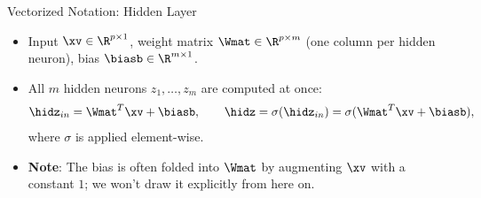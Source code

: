 %
%

\begin{vbframe}{Vectorized Notation: Hidden Layer}
\begin{itemize}
\item Input $\xv \in \R^{p \times 1}$, weight matrix $\Wmat \in \R^{p \times m}$ (one column per hidden neuron), bias $\biasb \in \R^{m \times 1}$.
\vspace{3mm}
\item All $m$ hidden neurons $z_1, \dots, z_m$ are computed at once:
$$ \hidz_{in} = \Wmat^T \xv + \biasb, \qquad \hidz = \sigma(\hidz_{in}) = \sigma(\Wmat^T \xv + \biasb),$$
where $\sigma$ is applied element-wise.
\vspace{3mm}
\item \textbf{Note}: The bias is often folded into $\Wmat$ by augmenting $\xv$ with a constant $1$; we won't draw it explicitly from here on.
\end{itemize}
\end{vbframe}

